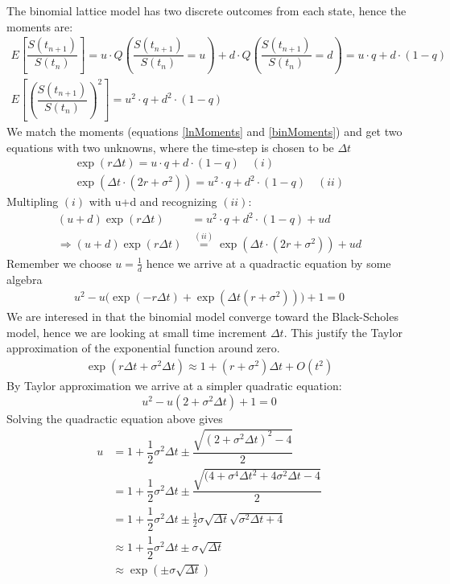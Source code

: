 The binomial lattice model has two discrete outcomes from each state, hence the moments are:
\begin{equation}\label{binMoments}
\begin{split}
E[\dfrac{S(t_{n+1})}{S(t_{n})}]=u \cdot Q(\dfrac{S(t_{n+1})}{S(t_{n})} = u) + d \cdot Q(\dfrac{S(t_{n+1})}{S(t_{n})} = d) = u \cdot q + d \cdot (1-q)\\
E[(\dfrac{S(t_{n+1})}{S(t_{n})})^2]=u^2 \cdot q + d^2 \cdot (1-q)
\end{split}
\end{equation}
We match the moments (equations \eqref{lnMoments} and \eqref{binMoments}) and get two equations with two unknowns, where the time-step is chosen to be $\Delta t$
\begin{align*}
\exp(r \Delta t)=u \cdot q + d \cdot (1-q) \quad (i)\\
\exp(\Delta t \cdot (2r + \sigma^2))=u^2 \cdot q + d^2 \cdot (1-q) \quad (ii)
\end{align*}
Multipling $(i)$ with u+d and recognizing $(ii)$:
\begin{align*}
(u+d)\exp(r \Delta t)&=u^2 \cdot q + d^2 \cdot (1-q) + ud\\
\Rightarrow (u+d)\exp(r \Delta t)&\overset{(ii)}{=}\exp(\Delta t \cdot (2r + \sigma^2)) + u d
\end{align*}
Remember we choose $u= \frac{1}{d}$ hence we arrive at a quadractic equation by some algebra
\begin{align*}
u^2 - u\bigg(\exp(-r \Delta t) + \exp(\Delta t(r+\sigma^2))\bigg)+1=0
\end{align*}
We are interesed in that the binomial model converge toward the Black-Scholes model, hence we are looking at small time increment $\Delta t$. This justify the Taylor approximation of the exponential function around zero.
\begin{align*}
\exp(r \Delta t + \sigma^2 \Delta t) \approx 1 + (r+\sigma^2)\Delta t + O(t^2)
\end{align*}
By Taylor approximation we arrive at a simpler quadratic equation:
\begin{equation*}
u^2-u(2+\sigma^2 \Delta t) + 1 = 0
\end{equation*}
Solving the quadractic equation above gives
\begin{align*}
u&=1+\dfrac{1}{2} \sigma^2 \Delta t \pm  \dfrac{\sqrt{(2+\sigma^2 \Delta t)^2 - 4}}{2}\\
&=1+\dfrac{1}{2} \sigma^2 \Delta t \pm  \dfrac{\sqrt{(4+\sigma^4 \Delta t^2 + 4 \sigma^2 \Delta t - 4}}{2}\\
&=1+\dfrac{1}{2} \sigma^2 \Delta t \pm \frac{1}{2} \sigma \sqrt{\Delta t} \sqrt{\sigma^2 \Delta t + 4}\\
&\approx 1+\dfrac{1}{2} \sigma^2 \Delta t \pm \sigma \sqrt{\Delta t}\\
&\approx \exp(\pm \sigma \sqrt{\Delta t})\\
\end{align*}


